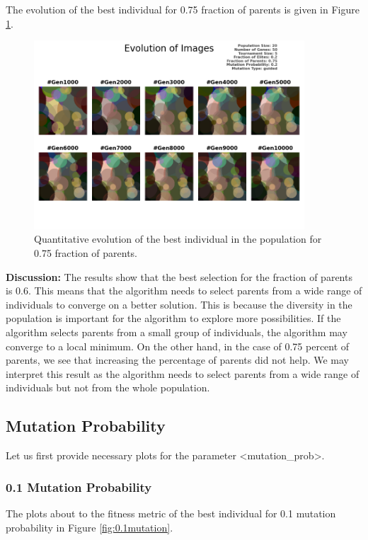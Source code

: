 \documentclass{assignment}
\begin{document}
The evolution of the best individual for 0.75 fraction of parents is given in Figure \ref{fig:0.75parents_image}.

\begin{figure}[!htb]
    \centering
    \includegraphics[width=0.9\textwidth]{figures/images_output_20_50_5_0.2_0.75_0.2_guided.png}
    \caption{Quantitative evolution of the best individual in the population for 0.75 fraction of parents.}
    \label{fig:0.75parents_image}
\end{figure}

\textbf{Discussion:} The results show that the best selection for the fraction of parents is 0.6. This means that the algorithm needs to select parents from a wide range of individuals to converge on a better solution. This is because the diversity in the population is important for the algorithm to explore more possibilities. If the algorithm selects parents from a small group of individuals, the algorithm may converge to a local minimum. On the other hand, in the case of 0.75 percent of parents, we see that increasing the percentage of parents did not help. We may interpret this result as the algorithm needs to select parents from a wide range of individuals but not from the whole population.


\subsection{Mutation Probability}
Let us first provide necessary plots for the parameter \textless{}mutation\_prob\textgreater{}.

\subsubsection{0.1 Mutation Probability}
The plots about to the fitness metric of the best individual for 0.1 mutation probability in Figure \ref{fig:0.1mutation}.
\end{document}
